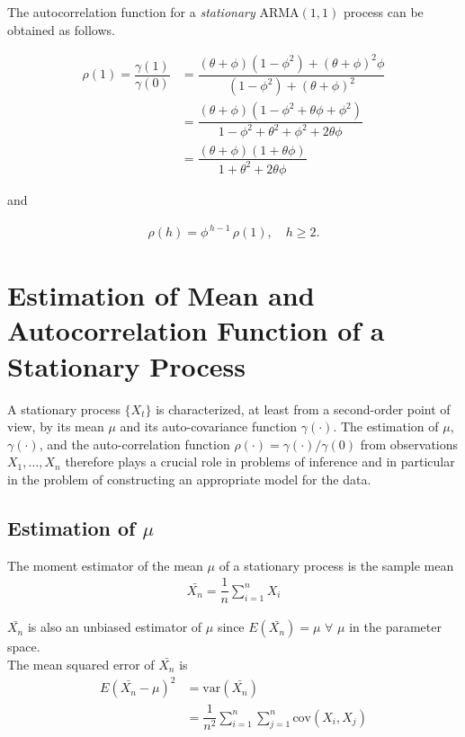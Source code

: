 \documentclass[11pt, a4paper]{article}
\numberwithin{equation}{section}
\theoremstyle{definition}
\begin{document}
The autocorrelation function for a \textit{stationary} ARMA$(1, 1)$ process can be obtained as follows.

\begin{align*}
\rho(1) = \dfrac{\gamma(1)}{\gamma(0)} &= \dfrac{(\theta + \phi)(1 - \phi^2) + (\theta + \phi)^2 \phi}{(1 - \phi^2) + (\theta + \phi)^2} \\[0.4em]
&= \dfrac{(\theta + \phi)(1 - \phi^2 + \theta\phi + \phi^2)}{1 - \phi^2 + \theta^2 + \phi^2 + 2\theta\phi} \\[0.4em]
&= \dfrac{(\theta + \phi)(1 + \theta \phi)}{1 + \theta^2 + 2\theta\phi}
\end{align*}

and

\begin{align*}
\rho(h) = \phi^{\,h-1}\,\rho(1), \quad h \geq 2.
\end{align*}

\newpage

\section{Estimation of Mean and Autocorrelation Function of a Stationary Process}

A stationary process $\{X_t\}$ is characterized, at least from a second-order point of view, by its mean $\mu$ and its auto-covariance function $\gamma(\cdot)$. The estimation of $\mu$, $\gamma(\cdot)$, and the auto-correlation function $\rho(\cdot) = \gamma(\cdot)/\gamma(0)$ from observations $X_1,\ldots, X_n$ therefore plays a crucial role in problems of inference and in particular in the problem of constructing an appropriate model for the data.

\subsection{Estimation of $\mu$}

The moment estimator of the mean $\mu$ of a stationary process is the sample mean
\begin{align*}
\bar{X_n} = \dfrac{1}{n} \sum \limits_{i = 1}^{n} X_i
\end{align*}

$\bar{X_n}$ is also an unbiased estimator of $\mu$ since $E(\bar{X_n}) = \mu$ $\forall$ $\mu$ in the parameter space. \\[0.25em]

The mean squared error of $\bar{X_n}$ is
\begin{align}\label{msestationary}
E(\bar{X_n} - \mu)^2 &= \text{var}(\bar{X_n}) \nonumber \\[0.25em]
&= \dfrac{1}{n^2} \sum \limits_{i = 1}^{n} \sum \limits_{j = 1}^{n} \text{cov}(X_i, X_j)
\end{align}
\end{document}
